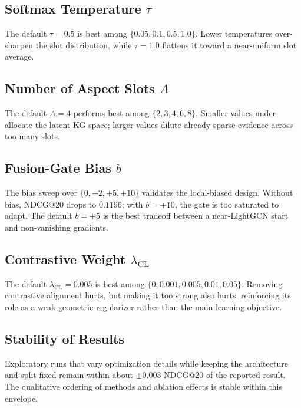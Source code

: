 \subsection{Softmax Temperature $\tau$}
\label{sec:sens-tau}

The default $\tau=0.5$ is best among $\{0.05,0.1,0.5,1.0\}$. Lower temperatures over-sharpen the slot distribution, while $\tau=1.0$ flattens it toward a near-uniform slot average.

\subsection{Number of Aspect Slots $A$}
\label{sec:sens-A}

The default $A=4$ performs best among $\{2,3,4,6,8\}$. Smaller values under-allocate the latent KG space; larger values dilute already sparse evidence across too many slots.

\subsection{Fusion-Gate Bias $b$}
\label{sec:sens-bias}

The bias sweep over $\{0,+2,+5,+10\}$ validates the local-biased design. Without bias, NDCG@20 drops to $0.1196$; with $b=+10$, the gate is too saturated to adapt. The default $b=+5$ is the best tradeoff between a near-LightGCN start and non-vanishing gradients.

\subsection{Contrastive Weight $\lambda_{\mathrm{CL}}$}
\label{sec:sens-lambda}

The default $\lambda_{\mathrm{CL}}=0.005$ is best among $\{0,0.001,0.005,0.01,0.05\}$. Removing contrastive alignment hurts, but making it too strong also hurts, reinforcing its role as a weak geometric regularizer rather than the main learning objective.

\subsection{Stability of Results}
\label{sec:eval-seed}

Exploratory runs that vary optimization details while keeping the architecture and split fixed remain within about $\pm 0.003$ NDCG@20 of the reported result. The qualitative ordering of methods and ablation effects is stable within this envelope.

